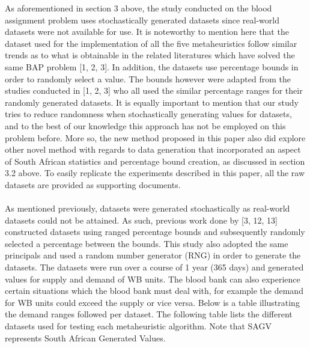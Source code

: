 \documentclass{article}
\begin{document}
As aforementioned in section 3 above, the study conducted on the blood assignment problem uses stochastically generated datasets since real-world datasets were not available for use. It is noteworthy to mention here that the dataset used for the implementation of all the five metaheuristics follow similar trends as to what is obtainable in the related literatures which have solved the same BAP problem [1, 2, 3]. In addition, the datasets use percentage bounds in order to randomly select a value. The bounds however were adapted from the studies conducted in [1, 2, 3] who all used the similar percentage ranges for their randomly generated datasets. It is equally important to mention that our study tries to reduce randomness when stochastically generating values for datasets, and to the best of our knowledge this approach has not be employed on this problem before. More so, the new method proposed in this paper also did explore other novel method with regards to data generation that incorporated an aspect of South African statistics and percentage bound creation, as discussed in section 3.2 above. To easily replicate the experiments described in this paper, all the raw datasets are provided as supporting documents.
\\
\\
As mentioned previously, datasets were generated stochastically as real-world datasets could not be attained. As such, previous work done by [3, 12, 13] constructed datasets using ranged percentage bounds and subsequently randomly selected a percentage between the bounds. This study also adopted the same principals and used a random number generator (RNG) in order to generate the datasets. The datasets were run over a course of 1 year (365 days) and generated values for supply and demand of WB units. The blood bank can also experience certain situations which the blood bank must deal with, for example the demand for WB units could exceed the supply or vice versa. Below is a table illustrating the demand ranges followed per dataset. The following table lists the different datasets used for testing each metaheuristic algorithm. Note that SAGV represents South African Generated Values.
\end{document}
